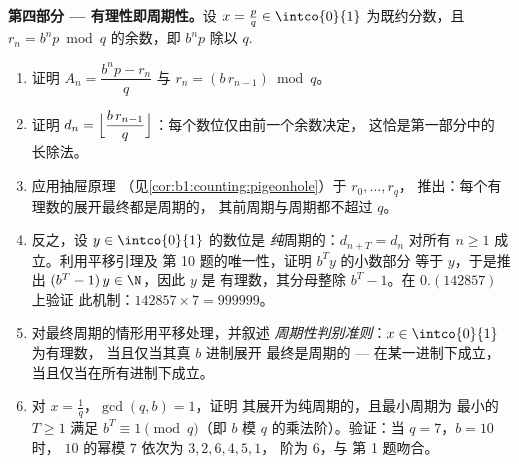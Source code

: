 \begin{problem}
\medskip
\noindent\textbf{第四部分 --- 有理性即周期性。}设 $x
= \frac pq \in \intco{0}{1}$ 为既约分数，且 $r_n = b^n p
\bmod q$ 的余数，即 $b^n p$ 除以
$q$.
\begin{enumerate}[resume]
  \item 证明 $A_n = \dfrac{b^n p - r_n}{q}$ 与 $r_n =
        (b\,r_{n-1}) \bmod q$。
  \item 证明 $d_n = \Bigl\lfloor \dfrac{b\,r_{n-1}}{q}
        \Bigr\rfloor$：每个数位仅由前一个余数决定，
        这恰是第一部分中的
        长除法。
  \item 应用抽屉原理
        （见\cref{cor:b1:counting:pigeonhole}）于 $r_0, \dots, r_q$，
        推出：每个有理数的展开最终都是周期的，
        其前周期与周期都不超过
        $q$。
  \item 反之，设 $y \in \intco{0}{1}$ 的数位是
        \emph{纯}周期的：$d_{n+T} = d_n$ 对所有 $n
        \geq 1$ 成立。利用平移引理及
        第 10 题的唯一性，证明 $b^T y$ 的小数部分
        等于 $y$，于是推出 $(b^T - 1)\,y \in \N$，因此 $y$ 是
        有理数，其分母整除 $b^T - 1$。在 $0.(142857)$ 上验证
        此机制：$142857 \times 7 = 999999$。
  \item 对最终周期的情形用平移处理，并叙述
        \emph{周期性判别准则}：$x \in \intco{0}{1}$ 为有理数，
        当且仅当其真 $b$ 进制展开
        最终是周期的 --- 在某一进制下成立，
        当且仅当在所有进制下成立。
  \item 对 $x = \frac 1q$，$\gcd(q, b) = 1$，证明
        其展开为纯周期的，且最小周期为
        最小的 $T \geq 1$ 满足 $b^T \equiv 1 \pmod q$（即
        $b$ 模 $q$ 的乘法阶）。验证：当 $q = 7$，$b = 10$ 时，
        $10$ 的幂模 $7$ 依次为 $3, 2, 6, 4, 5, 1$，
        阶为 $6$，与
        第 1 题吻合。
\end{enumerate}


\end{problem}

